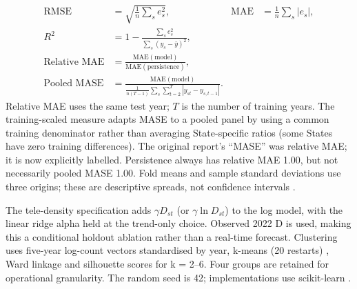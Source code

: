 \documentclass[runningheads]{llncs}
\begin{document}
\begin{align*}
\mathrm{RMSE}&=\sqrt{\frac{1}{n}\sum_s e_s^2},
&\mathrm{MAE}&=\frac{1}{n}\sum_s|e_s|,\\
R^2&=1-\frac{\sum_s e_s^2}{\sum_s(y_s-\bar y)^2},\\
\text{Relative MAE}&=\frac{\mathrm{MAE}(\text{model})}{\mathrm{MAE}(\text{persistence})},\\
\text{Pooled MASE}&=\frac{\mathrm{MAE}(\text{model})}{\frac{1}{n(T-1)}\sum_s\sum_{t=2}^{T}|y_{st}-y_{s,t-1}|}.
\end{align*}
Relative MAE uses the same test year; $T$ is the number of training years.
The training-scaled measure adapts MASE \cite{ref20} to a pooled panel by using a common training denominator rather than averaging State-specific ratios (some States have zero training differences). The original report's ``MASE'' was relative MAE; it is now explicitly labelled. Persistence always has relative MAE 1.00, but not necessarily pooled MASE 1.00. Fold means and sample standard deviations use three origins; these are descriptive spreads, not confidence intervals \cite{ref21}.

The tele-density specification adds $\gamma D_{st}$ (or $\gamma\ln D_{st}$) to the log model, with the linear ridge alpha held at the trend-only choice. Observed 2022 D is used, making this a conditional holdout ablation rather than a real-time forecast. Clustering uses five-year log-count vectors standardised by year, k-means (20 restarts) \cite{ref22}, Ward linkage \cite{ref23} and silhouette scores \cite{ref24} for k = 2--6. Four groups are retained for operational granularity. The random seed is 42; implementations use scikit-learn \cite{ref25}.

\FloatBarrier
\end{document}
